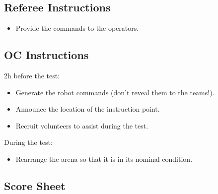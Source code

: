 \subsection*{Referee Instructions}
\begin{itemize}[nosep]
	\item Provide the commands to the operators.
\end{itemize}

\subsection*{OC Instructions}

2h before the test:
\begin{itemize}[nosep]
	\item Generate the robot commands (don't reveal them to the teams!).
	\item Announce the location of the instruction point.
	\item Recruit volunteers to assist during the test.
	\newline
\end{itemize}

\noindent During the test:
\begin{itemize}[nosep]
	\item Rearrange the arena so that it is in its nominal condition.
\end{itemize}

\subsection*{Score Sheet}


